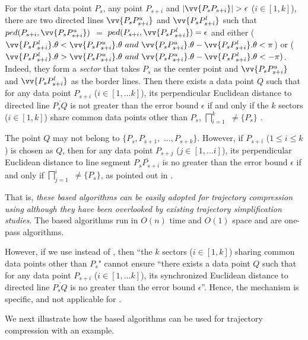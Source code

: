 For the start data point $P_s$, any point $P_{s+i}$ and $|\vv{P_sP_{s+i}}|>\epsilon$ ($i\in[1, k]$), there are two directed lines $\vv{P_sP^u_{s+i}}$ and $\vv{P_sP^l_{s+i}}$ such that $ped(P_{s+i}, \vv{P_sP^u_{s+i}})$ $=$ $ped(P_{s+i}, \vv{P_sP^l_{s+i}}) = \epsilon$ and either ($\vv{P_sP^l_{s+i}}.\theta < \vv{P_sP^u_{s+i}}.\theta ~and~\vv{P_sP^u_{s+i}}.\theta - \vv{P_sP^l_{s+i}}.\theta <\pi$) or ($\vv{P_sP^l_{s+i}}.\theta > \vv{P_sP^u_{s+i}}.\theta ~and~ \vv{P_sP^u_{s+i}}.\theta - \vv{P_sP^l_{s+i}}.\theta < -\pi)$. Indeed, they form a \emph{sector}  that takes $P_s$ as the center point and $\vv{P_sP^u_{s+i}}$ and $\vv{P_sP^l_{s+i}}$ as the border lines.
Then there exists a data point $Q$ such that for any data point $P_{s+i}$ ($i \in [1, ... k]$), its perpendicular Euclidean distance to
directed line $\overline{P_sQ}$ is not greater than the error bound $\epsilon$ if and only if the $k$ sectors  ($i\in[1,k]$) share common data points other than $P_s$, \ie $\bigsqcap_{i=1}^{k}$ $\ne \{P_s\}$ \cite{Williams:Longest, Sklansky:Cone,Zhao:Sleeve}.

The point $Q$ may not belong to $\{P_{s}, P_{s+1},$ $\ldots, P_{s+k}\}$.
However, if $P_{s+i}$ ($1\le i\le k$) is chosen as $Q$, then
for any data point $P_{s+j}$ ($j \in [1, ... i]$), its perpendicular Euclidean distance to
line segment $\overline{P_sP_{s+i}}$ is no greater than the error bound $\epsilon$ if and only if $\bigsqcap_{j=1}^{i}$ $\ne \{P_s\}$, as pointed out in \cite{Zhao:Sleeve}.

That is, {\em these \cia based algorithms can be easily adopted for trajectory compression using \ped although they have been overlooked by existing trajectory simplification studies}.
The \cia based algorithms run in $O(n)$ time and $O(1)$ space and are one-pass algorithms.

However, if we use \sed instead of \ped, then  ``the $k$ sectors  ($i\in[1,k]$) sharing common data points other than $P_s$" cannot ensure ``there exists a data point $Q$ such that for any data point $P_{s+i}$ ($i \in [1, ... k]$), its synchronized Euclidean distance to directed line $\overline{P_sQ}$ is no greater than the error bound $\epsilon$''.
Hence, the \cia mechanism is \ped specific, and not applicable for \sed.


We next illustrate how the \cia based algorithms can be used for trajectory compression with an example.

